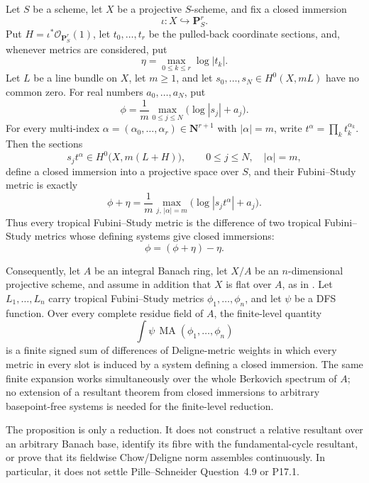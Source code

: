 
\begin{proposition}
\label{prop:p171-closed-immersion-finite-level-reduction}
Let \(S\) be a scheme, let \(X\) be a projective \(S\)-scheme, and fix a
closed immersion
\[
 \iota:X\hookrightarrow\mathbf P^r_S.
\]
Put \(H=\iota^*\mathcal O_{\mathbf P^r_S}(1)\), let
\(t_0,\ldots,t_r\) be the pulled-back coordinate sections, and, whenever
metrics are considered, put
\[
                         \eta=\max_{0\leq k\leq r}\log|t_k|.
\]
Let \(L\) be a line bundle on \(X\), let \(m\geq1\), and let
\(s_0,\ldots,s_N\in H^0(X,mL)\) have no common zero.  For real numbers
\(a_0,\ldots,a_N\), put
\[
                 \phi=\frac1m\max_{0\leq j\leq N}
                              \bigl(\log|s_j|+a_j\bigr).
\]
For every multi-index
\(\alpha=(\alpha_0,\ldots,\alpha_r)\in\mathbf N^{r+1}\) with
\(|\alpha|=m\), write \(t^\alpha=\prod_k t_k^{\alpha_k}\).  Then the
sections
\[
           s_jt^\alpha\in H^0\bigl(X,m(L+H)\bigr),
           \qquad 0\leq j\leq N,\quad |\alpha|=m,
\]
define a closed immersion into a projective space over \(S\), and their
Fubini--Study metric is exactly
\begin{equation}
\label{eq:p171-closed-immersion-metric-identity}
 \phi+\eta
 =\frac1m\max_{j,\,|\alpha|=m}
       \bigl(\log|s_jt^\alpha|+a_j\bigr).
\end{equation}
Thus every tropical Fubini--Study metric is the difference of two
tropical Fubini--Study metrics whose defining systems give closed
immersions:
\begin{equation}
\label{eq:p171-closed-immersion-difference}
                         \phi=(\phi+\eta)-\eta.
\end{equation}

Consequently, let \(A\) be an integral Banach ring, let \(X/A\) be an
\(n\)-dimensional projective scheme, and assume in addition that \(X\) is
flat over \(A\), as in
\cite[Definition~4.8 and Question~4.9]{PS23Hybrid}.  Let
\(L_1,\ldots,L_n\) carry tropical
Fubini--Study metrics \(\phi_1,\ldots,\phi_n\), and let \(\psi\) be a DFS
function.  Over every complete residue field of \(A\), the finite-level
quantity
\[
                       \int\psi\,
                       \operatorname{MA}(\phi_1,\ldots,\phi_n)
\]
is a finite signed sum of differences of Deligne-metric weights in which
every metric in every slot is induced by a system defining a closed
immersion.  The same finite expansion works simultaneously over the whole
Berkovich spectrum of \(A\); no extension of a resultant theorem from
closed immersions to arbitrary basepoint-free systems is needed for the
finite-level reduction.
\end{proposition}

\begin{remark}
\label{rem:p171-closed-immersion-reduction-scope}
The proposition is only a reduction.  It does not construct a relative
resultant over an arbitrary Banach base, identify its fibre with the
fundamental-cycle resultant, or prove that its fieldwise Chow/Deligne norm
assembles continuously.  In particular, it does not settle Pille--Schneider
Question~4.9 or P17.1.
\end{remark}
